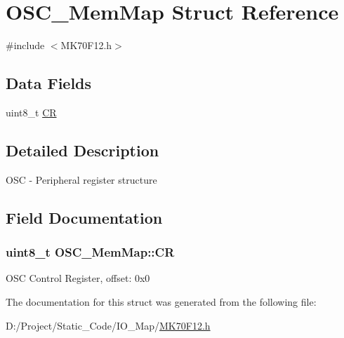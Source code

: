 \hypertarget{struct_o_s_c___mem_map}{}\section{O\+S\+C\+\_\+\+Mem\+Map Struct Reference}
\label{struct_o_s_c___mem_map}


{\ttfamily \#include $<$M\+K70\+F12.\+h$>$}

\subsection*{Data Fields}
\begin{DoxyCompactItemize}
\item 
uint8\+\_\+t \hyperlink{struct_o_s_c___mem_map_adb3c443099915a22c9951ff23c8eaa16}{C\+R}
\end{DoxyCompactItemize}


\subsection{Detailed Description}
O\+S\+C -\/ Peripheral register structure 

\subsection{Field Documentation}
\hypertarget{struct_o_s_c___mem_map_adb3c443099915a22c9951ff23c8eaa16}{}
\subsubsection[{C\+R}]{\setlength{\rightskip}{0pt plus 5cm}uint8\+\_\+t O\+S\+C\+\_\+\+Mem\+Map\+::\+C\+R}\label{struct_o_s_c___mem_map_adb3c443099915a22c9951ff23c8eaa16}
O\+S\+C Control Register, offset\+: 0x0 

The documentation for this struct was generated from the following file\+:\begin{DoxyCompactItemize}
\item 
D\+:/\+Project/\+Static\+\_\+\+Code/\+I\+O\+\_\+\+Map/\hyperlink{_m_k70_f12_8h}{M\+K70\+F12.\+h}\end{DoxyCompactItemize}
